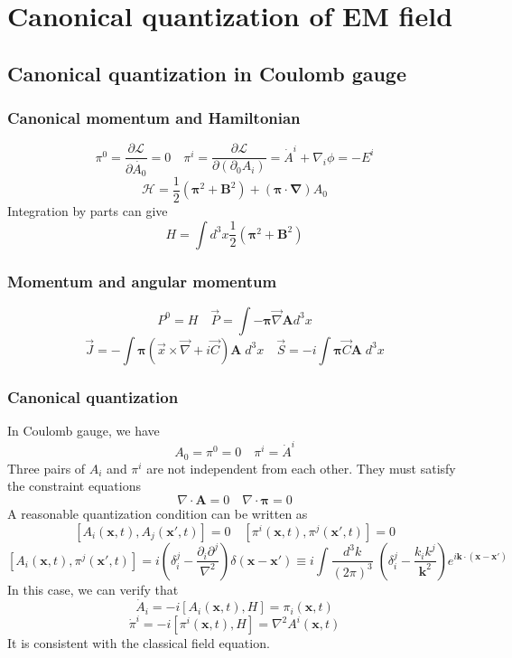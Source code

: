 \section{Canonical quantization of EM field}
\subsection{Canonical quantization in Coulomb gauge}

\subsubsection{Canonical momentum and Hamiltonian}
\[\pi^0 = \frac{\partial \mathcal{L}}{\partial \dot{A_0}} = 0 \quad  \pi^{i} = \frac{\partial \mathcal{L}}{\partial(\partial_0 A_i)} = \dot{A}^i + \nabla_i \phi = -E^i\]
\[\mathcal{H} = \frac{1}{2}(\bm{\pi}^2 + \bm{B}^2) + (\bm{\pi} \cdot \bm{\nabla}) A_0\]
Integration by parts can give
\[H = \int d^3x \frac{1}{2}(\bm{\pi}^2 + \bm{B}^2)\]

\subsubsection{Momentum and angular momentum}
\[P^0 = H \quad \vec{P} = \int - \bm{\pi} \vec{\nabla} \bm{A} d^3x\]
\[\vec{J} = - \int \bm{\pi} (\vec{x}\times \vec{\nabla} + i \vec{C})\bm{A} \; d^3x \quad \vec{S} = -i \int \bm{\pi} \vec{C} \bm{A} \; d^3x\]

\subsubsection{Canonical quantization}
\noindent
In Coulomb gauge, we have
\[A_0 = \pi^0 = 0 \quad \pi^i = \dot{A}^i \]
Three pairs of $A_i$ and $\pi^i$ are not independent from each other. They must satisfy the constraint equations
\[\nabla \cdot \bm{A} = 0 \quad \nabla \cdot \bm{\pi} = 0\]
A reasonable quantization condition can be written as
\[[A_i(\bm{x},t),A_j(\bm{x}',t)] = 0 \quad [\pi^i(\bm{x},t),\pi^j(\bm{x}',t)] = 0\]
\[[A_i(\bm{x},t),\pi^j(\bm{x}',t)] = i \left( \delta^{j}_i - \frac{\partial_i \partial^j}{\nabla^2} \right) \delta(\bm{x}-\bm{x}') \equiv i \int \frac{d^3k}{(2\pi)^3} \; (\delta^j_i - \frac{k_ik^j}{\bm{k}^2})e^{i\bm{k}\cdot(\bm{x}-\bm{x}')}\]
In this case, we can verify that
\[\dot{A}_i = -i[A_i(\bm{x},t),H] = \pi_i (\bm{x},t)\]
\[\dot{\pi}^i = -i[\pi^i(\bm{x},t),H] = \nabla^2 A^i(\bm{x},t)\]
It is consistent with the classical field equation.

